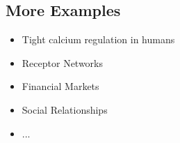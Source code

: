 \subsection{More Examples}
\label{subsec:more-examples}
\begin{frame}{\insertsubsection}

    \begin{itemize}[<+->]
        \item Tight calcium regulation in humans
        \item Receptor Networks
        \item Financial Markets
        \item Social Relationships
        \item ...
    \end{itemize}
\end{frame}
%
%